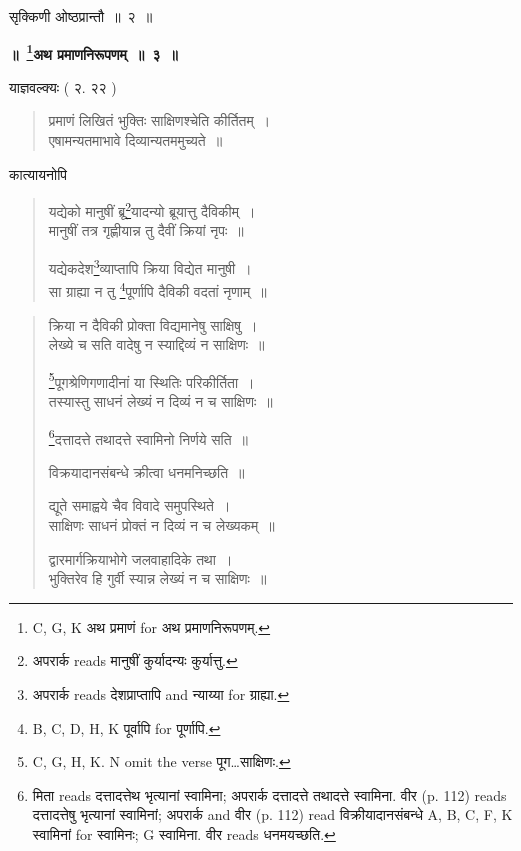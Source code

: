 \documentclass[11pt, openany]{book}
\begin{document}
सृक्किणी ओष्ठप्रान्तौ~॥~२~॥

\begin{center}
\textbf{\Large ॥~\renewcommand{\thefootnote}{3}\footnote{C, G, K अथ प्रमाणं for अथ प्रमाणनिरूपणम्.}अथ प्रमाणनिरूपणम्~॥~३~॥}
\end{center}

याज्ञवल्क्यः ( २. २२ )

\begin{quote}
{\vy प्रमाणं लिखितं भुक्तिः साक्षिणश्चेति कीर्तितम्~।\\
एषामन्यतमाभावे दिव्यान्यतममुच्यते~॥}
\end{quote}

कात्यायनोपि

\begin{quote}
{\vy यद्येको मानुषीं ब्रू\renewcommand{\thefootnote}{4}\footnote{अपरार्क reads मानुषीं कुर्यादन्यः कुर्यात्तु.}यादन्यो ब्रूयात्तु दैविकीम्~।\\
मानुषीं तत्र गृह्णीयान्न तु दैवीं क्रियां नृपः~॥

यद्येकदेश\renewcommand{\thefootnote}{5}\footnote{अपरार्क reads देशप्राप्तापि and न्याय्या for ग्राह्या.}व्याप्तापि क्रिया विद्येत मानुषी~।\\
सा ग्राह्या न तु \renewcommand{\thefootnote}{6}\footnote{B, C, D, H, K पूर्वापि for पूर्णापि.}पूर्णापि दैविकी वदतां नृणाम्~॥}
\end{quote}

\newpage
{}
\fancyhead[RO]{[ $\S$ ३ }
\fancyhead[LE]{$\S$ ३ ]}


\begin{quote}
{\vy क्रिया न दैविकी प्रोक्ता विद्यमानेषु साक्षिषु~।\\
लेख्ये च सति वादेषु न स्याद्दिव्यं न साक्षिणः~॥

\renewcommand{\thefootnote}{1}\footnote{C, G, H, K. N omit the verse पूग\ldots साक्षिणः.}पूगश्रेणिगणादीनां या स्थितिः परिकीर्तिता~।\\
तस्यास्तु साधनं लेख्यं न दिव्यं न च साक्षिणः~॥

\renewcommand{\thefootnote}{2}\footnote{मिता reads दत्तादत्तेथ भृत्यानां स्वामिना; अपरार्क {\qt दत्तादत्ते तथादत्ते स्वामिना}. वीर (p. 112) reads {\qt दत्तादत्तेषु भृत्यानां स्वामिनां}; अपरार्क and वीर (p. 112) read {\qt विक्रीयादानसंबन्धे} A, B, C, F, K स्वामिनां for स्वामिनः; G स्वामिना. वीर reads {\qt धनमयच्छति}.}दत्तादत्ते तथादत्ते स्वामिनो निर्णये सति~॥

विक्रयादानसंबन्धे क्रीत्वा धनमनिच्छति~॥

द्यूते समाह्वये चैव विवादे समुपस्थिते~।\\
साक्षिणः साधनं प्रोक्तं न दिव्यं न च लेख्यकम्~॥

द्वारमार्गक्रियाभोगे जलवाहादिके तथा~।\\
भुक्तिरेव हि गुर्वी स्यान्न लेख्यं न च साक्षिणः~॥}
\end{quote}
\end{document}
